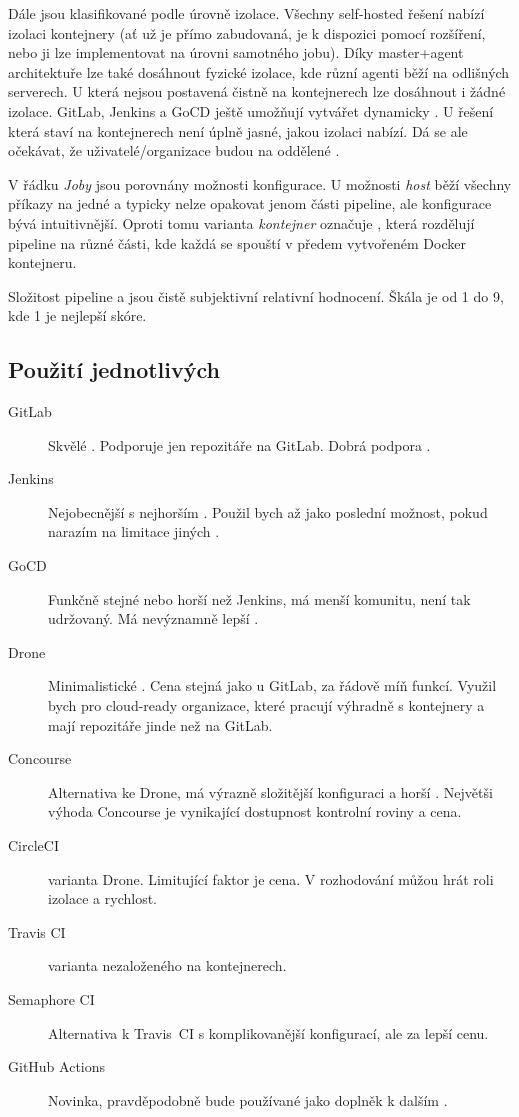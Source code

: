     Dále jsou \CI klasifikované podle úrovně izolace. Všechny self-hosted řešení nabízí izolaci kontejnery (ať už je přímo zabudovaná, je k dispozici pomocí rozšíření, nebo ji lze implementovat na úrovni samotného jobu). Díky master+agent architektuře lze také dosáhnout fyzické izolace, kde různí agenti běží na odlišných serverech. U \CI která nejsou postavená čistně na kontejnerech lze dosáhnout i žádné izolace. GitLab, Jenkins a GoCD ještě umožňují vytvářet dynamicky . U  řešení která staví na kontejnerech není úplně jasné, jakou izolaci nabízí. Dá se ale očekávat, že uživatelé/organizace budou na oddělené .

    V řádku \textit{Joby} jsou porovnány možnosti konfigurace. U možnosti \textit{host} běží všechny příkazy na jedné  a typicky nelze opakovat jenom části pipeline, ale konfigurace bývá intuitivnější. Oproti tomu varianta \textit{kontejner} označuje \CI, která rozdělují pipeline na různé části, kde každá se spouští v předem vytvořeném Docker kontejneru.

    Složitost pipeline a  jsou čistě subjektivní relativní hodnocení. Škála je od 1 do 9, kde 1 je nejlepší skóre.

    \subsection{Použití jednotlivých \CI}
        \begin{description}
            \item[GitLab] Skvělé \CI. Podporuje jen repozitáře na GitLab. Dobrá podpora \CD.
            \item[Jenkins] Nejobecnější \CI s nejhorším . Použil bych až jako poslední možnost, pokud narazím na limitace jiných \CI.
            \item[GoCD] Funkčně stejné nebo horší než Jenkins, má menší komunitu, není tak udržovaný. Má nevýznamně lepší .
            \item[Drone] Minimalistické \CI. Cena stejná jako u GitLab, za řádově míň funkcí. Využil bych pro cloud-ready organizace, které pracují výhradně s kontejnery a mají repozitáře jinde než na GitLab.
            \item[Concourse] Alternativa ke Drone, má výrazně složitější konfiguraci a horší . Největši výhoda Concourse je vynikající dostupnost kontrolní roviny a cena.
            \item[CircleCI]  varianta Drone. Limitující faktor je cena. V rozhodování můžou hrát roli izolace a rychlost.
            \item[Travis CI]  varianta \CI nezaloženého na kontejnerech.
            \item[Semaphore CI] Alternativa k Travis~CI s komplikovanější konfigurací, ale za lepší cenu.
            \item[GitHub Actions] Novinka, pravděpodobně bude používané jako doplněk k dalším \CI.
        \end{description}

